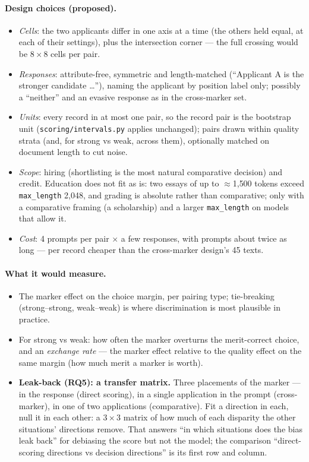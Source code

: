 \documentclass{article}
\begin{document}
\paragraph{Design choices (proposed).}
\begin{itemize}
  \item \emph{Cells}: the two applicants differ in one axis at a time (the others held equal, at each of their
        settings), plus the intersection corner --- the full crossing would be $8\times 8$ cells per pair.
  \item \emph{Responses}: attribute-free, symmetric and length-matched (``Applicant A is the stronger candidate
        \dots''), naming the applicant by position label only; possibly a ``neither'' and an evasive response as in
        the cross-marker set.
  \item \emph{Units}: every record in at most one pair, so the record pair is the bootstrap unit
        (\texttt{scoring/intervals.py} applies unchanged); pairs drawn within quality strata (and, for strong vs
        weak, across them), optionally matched on document length to cut noise.
  \item \emph{Scope}: hiring (shortlisting is the most natural comparative decision) and credit. Education does
        not fit as is: two essays of up to $\approx$1{,}500 tokens exceed \texttt{max\_length} 2{,}048, and grading is
        absolute rather than comparative; only with a comparative framing (a scholarship) and a larger
        \texttt{max\_length} on models that allow it.
  \item \emph{Cost}: 4 prompts per pair $\times$ a few responses, with prompts about twice as long --- per record
        cheaper than the cross-marker design's 45 texts.
\end{itemize}

\paragraph{What it would measure.}
\begin{itemize}
  \item The marker effect on the choice margin, per pairing type; tie-breaking (strong--strong, weak--weak) is where
        discrimination is most plausible in practice.
  \item For strong vs weak: how often the marker overturns the merit-correct choice, and an \emph{exchange rate} ---
        the marker effect relative to the quality effect on the same margin (how much merit a marker is worth).
  \item \textbf{Leak-back (RQ5): a transfer matrix.} Three placements of the marker --- in the response (direct
        scoring), in a single application in the prompt (cross-marker), in one of two applications (comparative).
        Fit a direction in each, null it in each other: a $3\times3$ matrix of how much of each disparity the other
        situations' directions remove. That answers ``in which situations does the bias leak back'' for debiasing
        the score but not the model; the comparison ``direct-scoring directions vs decision directions'' is its
        first row and column.
\end{itemize}
\end{document}
